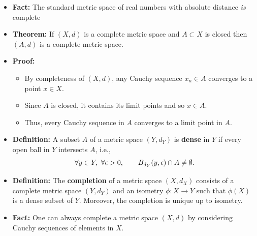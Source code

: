 \documentclass[11pt,twoside]{report}
\begin{document}
\begin{itemize}
\item \textbf{Fact:} The  standard metric space of real numbers with absolute distance  \emph{is} complete



\item \textbf{Theorem:} If $(X,d)$ is a complete metric space and $A \subset X$ is closed  then $(A, d)$ is a complete metric space. 

\item \textbf{Proof:}
\begin{itemize}

\item By completeness of $(X,d)$, any Cauchy sequence  $x_n \in A$ converges to a point $x \in X$. 
\item Since $A$ is closed, it contains its limit points and so $x \in A$. 
\item Thus, every Cauchy sequence in $A$ converges to a limit point in $A$. 
\end{itemize}



\item \textbf{Definition:} A subset $A$ of a metric space $(Y,d_Y)$ is \textbf{dense} in $Y$ if every open ball in $Y$ intersects $A$, i.e.,
\[
\forall y \in Y,\ \forall \epsilon>0, \qquad B_{d_Y}(y,\epsilon) \cap A \ne \emptyset.
\]

\item \textbf{Definition:} 
The \textbf{completion} of a metric space $(X,d_X)$ consists of a complete metric space $(Y,d_Y)$ and an isometry $\phi  \colon X \rightarrow Y$ such that $\phi(X)$ is a dense subset of $Y$.
Moreover, the completion is unique up to isometry.


\item \textbf{Fact:} 
One can always complete a metric space $(X,d)$ by considering Cauchy sequences of elements in $X$.



\end{itemize}
\end{document}

